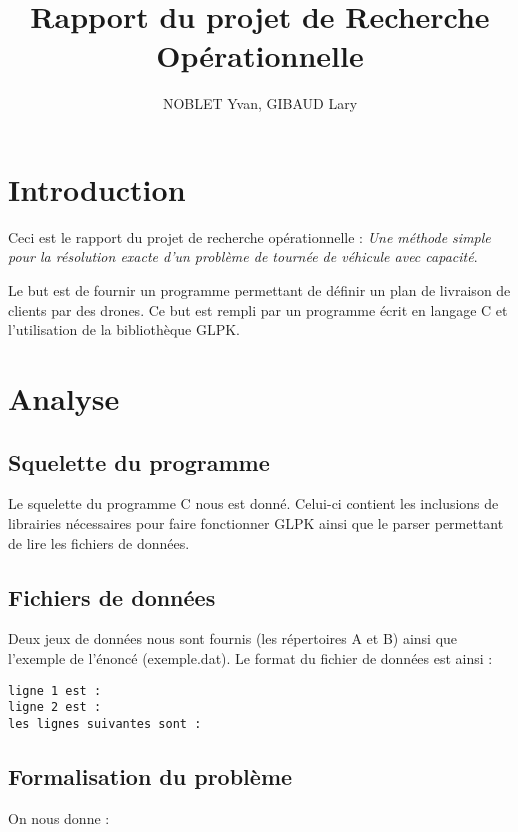 \documentclass[a4paper,10pt]{article}
\title{Rapport du projet de Recherche Opérationnelle}
\author{NOBLET Yvan, GIBAUD Lary}
\begin{document}
\renewcommand{\labelitemi}{$\bullet$}


\date{}
\maketitle
\tableofcontents
\section{Introduction}

Ceci est le rapport du projet de recherche opérationnelle : 
\emph{Une méthode simple pour la résolution exacte d’un problème
 de tournée de véhicule avec capacité}.

Le but est de fournir un programme permettant de définir un plan de livraison de clients par des drones. 
Ce but est rempli par un programme écrit en langage C et l'utilisation de la bibliothèque GLPK.

\section{Analyse}

\subsection{Squelette du programme}

Le squelette du programme C nous est donné. Celui-ci contient les inclusions de librairies nécessaires pour faire fonctionner GLPK ainsi que le parser permettant de lire les fichiers de données.

\subsection{Fichiers de données}

Deux jeux de données nous sont fournis (les répertoires A et B) ainsi que l'exemple de l'énoncé (exemple.dat). Le format du fichier de données est ainsi :
\begin{verbatim}
ligne 1 est :
ligne 2 est :
les lignes suivantes sont :
\end{verbatim}

\subsection{Formalisation du problème}

On nous donne :
\end{document}
